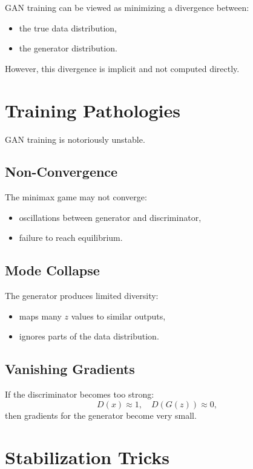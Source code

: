 GAN training can be viewed as minimizing a divergence between:
\begin{itemize}
    \item the true data distribution,
    \item the generator distribution.
\end{itemize}

However, this divergence is implicit and not computed directly.

\section{Training Pathologies}

GAN training is notoriously unstable.

\subsection{Non-Convergence}

The minimax game may not converge:
\begin{itemize}
    \item oscillations between generator and discriminator,
    \item failure to reach equilibrium.
\end{itemize}

\subsection{Mode Collapse}

The generator produces limited diversity:
\begin{itemize}
    \item maps many $z$ values to similar outputs,
    \item ignores parts of the data distribution.
\end{itemize}

\subsection{Vanishing Gradients}

If the discriminator becomes too strong:
\[
D(x) \approx 1,\quad D(G(z)) \approx 0,
\]
then gradients for the generator become very small.

\section{Stabilization Tricks}

